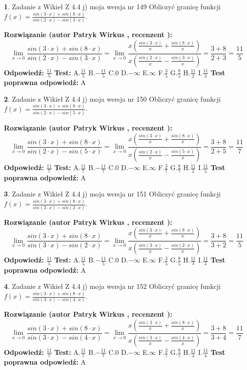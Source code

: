 \documentclass[12pt, a4paper]{article}
\theoremstyle{definition} %
\newtheorem{zad}{}
\newcommand{\zadStart}[1]{\begin{zad}#1\newline}
\newcommand{\zadStop}{\end{zad}}
\newcommand{\rozwStart}[2]{\noindent \textbf{Rozwiązanie (autor #1 , recenzent #2): }\newline}
\newcommand{\rozwStop}{\newline}
\newcommand{\odpStart}{\noindent \textbf{Odpowiedź:}\newline}
\newcommand{\odpStop}{\newline}
\newcommand{\testStart}{\noindent \textbf{Test:}\newline}
\newcommand{\testStop}{\newline}
\newcommand{\kluczStart}{\noindent \textbf{Test poprawna odpowiedź:}\newline}
\newcommand{\kluczStop}{\newline}
\begin{document}
\zadStart{Zadanie z Wikieł Z 4.4 j) moja wersja nr 149}
Obliczyć granicę funkcji $f(x)=\frac{sin(3\cdot x) +sin(8\cdot x)}{sin(2\cdot x) -sin(3\cdot x)}$.
\zadStop
\rozwStart{Patryk Wirkus}{}
$$\lim\limits_{x\to 0}\frac{sin(3\cdot x) +sin(8\cdot x)}{sin(2\cdot x) -sin(3\cdot x)}=\lim\limits_{x\to 0}\frac{x(\frac{sin(3\cdot x)}{x}+\frac{sin(8\cdot x)}{x})}{x(\frac{sin(2\cdot x)}{x}-\frac{sin(3\cdot x)}{x})}=\frac{3+8}{2+3} = \frac{11}{5}$$
\rozwStop
\odpStart
$\frac{11}{5}$
\odpStop
\testStart
A.$\frac{11}{5}$
B.$-\frac{11}{5}$
C.$0$
D.$-\infty$
E.$\infty$
F.$\frac{3}{5}$
G.$\frac{8}{5}$
H.$\frac{11}{2}$
I.$\frac{11}{3}$
\testStop
\kluczStart
A
\kluczStop



\zadStart{Zadanie z Wikieł Z 4.4 j) moja wersja nr 150}
Obliczyć granicę funkcji $f(x)=\frac{sin(3\cdot x) +sin(8\cdot x)}{sin(2\cdot x) -sin(5\cdot x)}$.
\zadStop
\rozwStart{Patryk Wirkus}{}
$$\lim\limits_{x\to 0}\frac{sin(3\cdot x) +sin(8\cdot x)}{sin(2\cdot x) -sin(5\cdot x)}=\lim\limits_{x\to 0}\frac{x(\frac{sin(3\cdot x)}{x}+\frac{sin(8\cdot x)}{x})}{x(\frac{sin(2\cdot x)}{x}-\frac{sin(5\cdot x)}{x})}=\frac{3+8}{2+5} = \frac{11}{7}$$
\rozwStop
\odpStart
$\frac{11}{7}$
\odpStop
\testStart
A.$\frac{11}{7}$
B.$-\frac{11}{7}$
C.$0$
D.$-\infty$
E.$\infty$
F.$\frac{3}{7}$
G.$\frac{8}{7}$
H.$\frac{11}{2}$
I.$\frac{11}{5}$
\testStop
\kluczStart
A
\kluczStop



\zadStart{Zadanie z Wikieł Z 4.4 j) moja wersja nr 151}
Obliczyć granicę funkcji $f(x)=\frac{sin(3\cdot x) +sin(8\cdot x)}{sin(3\cdot x) -sin(2\cdot x)}$.
\zadStop
\rozwStart{Patryk Wirkus}{}
$$\lim\limits_{x\to 0}\frac{sin(3\cdot x) +sin(8\cdot x)}{sin(3\cdot x) -sin(2\cdot x)}=\lim\limits_{x\to 0}\frac{x(\frac{sin(3\cdot x)}{x}+\frac{sin(8\cdot x)}{x})}{x(\frac{sin(3\cdot x)}{x}-\frac{sin(2\cdot x)}{x})}=\frac{3+8}{3+2} = \frac{11}{5}$$
\rozwStop
\odpStart
$\frac{11}{5}$
\odpStop
\testStart
A.$\frac{11}{5}$
B.$-\frac{11}{5}$
C.$0$
D.$-\infty$
E.$\infty$
F.$\frac{3}{5}$
G.$\frac{8}{5}$
H.$\frac{11}{3}$
I.$\frac{11}{2}$
\testStop
\kluczStart
A
\kluczStop



\zadStart{Zadanie z Wikieł Z 4.4 j) moja wersja nr 152}
Obliczyć granicę funkcji $f(x)=\frac{sin(3\cdot x) +sin(8\cdot x)}{sin(3\cdot x) -sin(4\cdot x)}$.
\zadStop
\rozwStart{Patryk Wirkus}{}
$$\lim\limits_{x\to 0}\frac{sin(3\cdot x) +sin(8\cdot x)}{sin(3\cdot x) -sin(4\cdot x)}=\lim\limits_{x\to 0}\frac{x(\frac{sin(3\cdot x)}{x}+\frac{sin(8\cdot x)}{x})}{x(\frac{sin(3\cdot x)}{x}-\frac{sin(4\cdot x)}{x})}=\frac{3+8}{3+4} = \frac{11}{7}$$
\rozwStop
\odpStart
$\frac{11}{7}$
\odpStop
\testStart
A.$\frac{11}{7}$
B.$-\frac{11}{7}$
C.$0$
D.$-\infty$
E.$\infty$
F.$\frac{3}{7}$
G.$\frac{8}{7}$
H.$\frac{11}{3}$
I.$\frac{11}{4}$
\testStop
\kluczStart
A
\kluczStop
\end{document}
